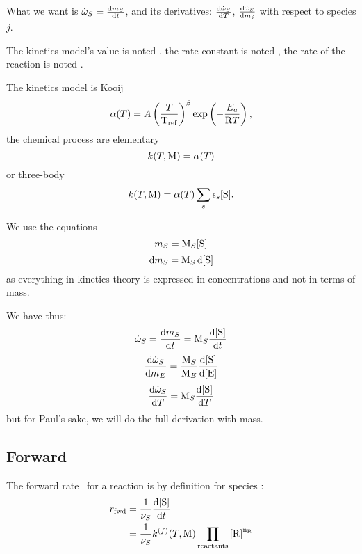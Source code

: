 What we want is 
$\mdot[S] = \doverdt{\mass[S]}$, and its derivatives:
$\doverdT{\mdot[S]}$, $\doverdm[j]{\mdot[S]}$ with respect to species $j$.

The kinetics model's value is noted \kinMod, the rate constant is noted \rateCons, the
rate of the reaction is noted \rate.

The kinetics model is Kooij 
\begin{equation}
\alpha(T) = {A} \left(\frac{T}{\mathrm{T_{ref}}}\right)^{\beta}\exp\left(-\frac{E_a}{\mathrm{R} T}\right),
\label{KooijEq}
\end{equation}
the chemical process are elementary 
\begin{equation}
\rateCons = \kinMod
\label{ChemProEl}
\end{equation} 
or three-body 
\begin{equation}
\rateCons = \kinMod \threeBody.
\label{ChemProTB}
\end{equation}

We use the equations
\begin{equation}
\mass[S] = \Mm[S] \conc[S]
\end{equation}
\begin{equation}
\dd\mass[S] = \Mm[S]\,\dd\conc[S]
\end{equation}
as everything in kinetics theory is expressed in concentrations and 
not in terms of mass.

We have thus:
\begin{equation}
\mdot[S] = \doverdt{\mass[S]} = \Mm[S] \doverdt{\conc[S]}
\end{equation}
\begin{equation}
\doverdm[E]{\mdot[S]} = \frac{\Mm[S]}{\Mm[E]}\doverdc[E]{\conc[S]}
\end{equation}
\begin{equation}
\doverdT{\mdot[S]} = \Mm[S]\doverdT{\conc[S]}
\end{equation}
but for Paul's sake, we will do the full derivation with mass.

\subsection{Forward}

The forward rate \ratef\ for a reaction is by definition for species :
\begin{equation}
\begin{split}
\ratef &= \frac{1}{\scoef[S]}\frac{\dd\conc[S]}{\dd t}\\
       &= \frac{1}{\scoef[S]} \rateConsf \prodReac
\end{split}
\label{ratefDef}
\end{equation}

